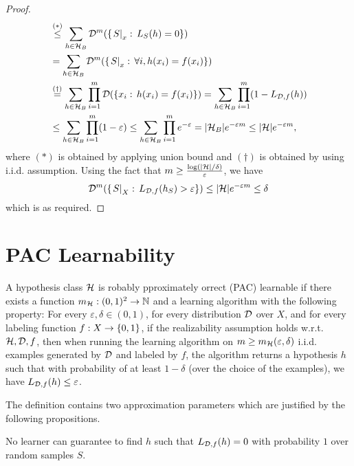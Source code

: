 \documentclass[11pt,a4paper]{article}
\begin{document}
\begin{proof}
\begin{align*}
&\overset{(*)}{\le} \sum_{h\in \mathcal{H}_B}\mathcal{D}^m(\{\left.S\right|_{x}:\, L_S(h) = 0\})\\
&= \sum_{h\in \mathcal{H}_B}\mathcal{D}^m(\{\left.S\right|_{x}:\, \forall i, h(x_i) = f(x_i)\}) \\
&\overset{(\dagger)}{=} \sum_{h\in \mathcal{H}_B}\prod_{i=1}^m\mathcal{D}(\{x_i:\, h(x_i) = f(x_i)\})= \sum_{h\in \mathcal{H}_B}\prod_{i=1}^m(1-L_{\mathcal{D},f}(h))\\
&\le \sum_{h\in \mathcal{H}_B}\prod_{i=1}^m(1-\varepsilon) \le \sum_{h\in \mathcal{H}_B}\prod_{i=1}^m e^{-\varepsilon} = |\mathcal{H}_B|e^{-\varepsilon m}
\le |\mathcal{H}|e^{-\varepsilon m},
\end{align*}
where $(*)$ is obtained by applying union bound and $(\dagger)$ is obtained by using i.i.d. assumption. Using the fact that $m\ge \frac{\log(|\mathcal{H}|/\delta)}{\varepsilon}$, we have 
\begin{equation*}
\mathcal{D}^m(\{\left.S\right|_{X}:\, L_{\mathcal{D},f}(h_S)>\varepsilon\})\le |\mathcal{H}|e^{-\varepsilon m} \le \delta
\end{equation*}
which is as required.
\end{proof}

\section{PAC Learnability}

\begin{definition} \label{def:PAC_learning}
A hypothesis class $\mathcal{H}$ is robably pproximately orrect (PAC) learnable if there exists a function $m_{\mathcal{H}}:(0,1)^2\rightarrow \mathbb{N}$ and a learning algorithm with the following property: For every $\varepsilon,\delta\in (0,1)$, for every distribution $\mathcal{D}$ over $X$, and for every labeling function $f:X\rightarrow \{0,1\}$, if the realizability assumption holds w.r.t. $\mathcal{H},\mathcal{D}, f$, then when running the learning algorithm on $m\ge m_{\mathcal{H}}(\varepsilon,\delta)$ i.i.d.\,examples generated by $\mathcal{D}$ and labeled by $f$, the algorithm returns a hypothesis $h$ such that with probability of at least $1-\delta$ (over the choice of the examples), we have $L_{\mathcal{D},f}(h)\le \varepsilon$.
\end{definition}

The definition contains two approximation parameters which are justified by the following propositions.

\begin{proposition}
No learner can guarantee to find $h$ such that $L_{\mathcal{D}, f}(h) = 0$ with probability $1$ over random samples $S$.
\end{proposition}
\end{document}

